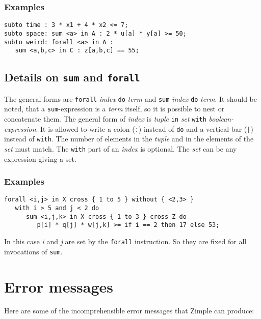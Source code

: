 \documentclass[12pt]{article}
\newcommand{\zimple}{{\sc Zimple}\xspace}
\newcommand{\code}[1]{{\tt #1}\xspace}
\begin{document}
\subsubsection{Examples}
{\small 
\begin{verbatim}
subto time : 3 * x1 + 4 * x2 <= 7;
subto space: sum <a> in A : 2 * u[a] * y[a] >= 50;
subto weird: forall <a> in A : 
   sum <a,b,c> in C : z[a,b,c] == 55;
\end{verbatim}
}

\subsection{Details on \code{sum} and \code{forall}}
The general forms are
\code{forall} \emph{index} \code{do} \emph{term} and \code{sum}
\emph{index} \code{do} \emph{term}. It should be
noted, that a \code{sum}-expression is a \emph{term} itself, so it is
possible to nest or concatenate them.
The general form of \emph{index} is 
\emph{tuple} \code{in} \emph{set} \code{with} \emph{boolean-expression}.
It is allowed to write a colon (\code{:}) instead of \code{do} and a
vertical bar (\code{|}) instead of \code{with}.
The number of elements in the \emph{tuple} and in the elements of the
\emph{set} must match. The \code{with} part of an \emph{index} is
optional. The \emph{set} can be any expression giving a set.

\subsubsection{Examples}
{\small 
\begin{verbatim}
forall <i,j> in X cross { 1 to 5 } without { <2,3> } 
   with i > 5 and j < 2 do 
      sum <i,j,k> in X cross { 1 to 3 } cross Z do 
         p[i] * q[j] * w[j,k] >= if i == 2 then 17 else 53;
\end{verbatim}
}

In this case \emph{i} and \emph{j} are set by the \code{forall}
instruction. So they are fixed for all invocations of \code{sum}.

\section{Error messages}
Here are some of the incomprehensible error messages that \zimple
can produce:
\end{document}

